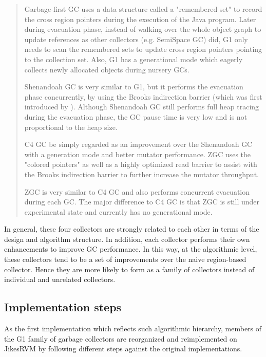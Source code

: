 \begin{quote}
  Garbage-first GC uses a data structure called a "remembered set" to record the
  cross region pointers during the execution of the Java program.
  Later during evacuation phase, instead of walking over the whole object graph to update
  references as other collectors (e.g. SemiSpace GC) did, G1 only needs to scan the
  remembered sets to update cross region pointers pointing to the collection set.
  Also, G1 has a generational mode which eagerly collects newly allocated objects
  during nursery GCs.

  Shenandoah GC is very similar to G1, but it performs the evacuation phase concurrently, by using the
  Brooks indirection barrier (which was first introduced by \cite{brooks1984trading}).
  Although Shenandoah GC still performs full heap tracing during the evacuation phase,
  the GC pause time is very low and is not proportional to the heap size.

  C4 GC be simply regarded as an improvement over the Shenandoah GC with a generation mode and better mutator performance.
  ZGC uses the "colored pointers"
  as well as a highly optimized read barrier to assist with the Brooks indirection barrier
  to further increase the mutator throughput.
  
  ZGC is very similar to C4 GC and also performs concurrent evacuation during each
  GC. The major difference to C4 GC is that ZGC is still under experimental state
  and currently has no generational mode.

\end{quote}

In general, these four collectors are strongly related to each other in terms of
the design and algorithm structure. In addition, each collector performs their
own enhancements to improve GC performance. In this way, at the algorithmic level,
these collectors tend to be a set of improvements over the naive region-based collector.
Hence they are more likely to form as a family of collectors
instead of individual and unrelated collectors.

\subsection{Implementation steps}

As the first implementation which reflects such algorithmic hierarchy,
members of the G1 family of garbage collectors are reorganized and reimplemented on JikesRVM
by following different steps against the original implementations. 

